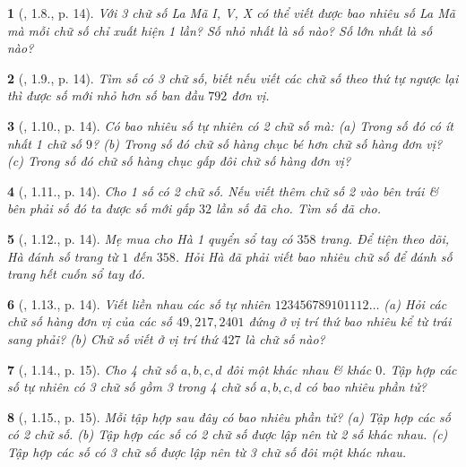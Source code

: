 \documentclass{article}
\newtheorem{baitoan}{}
\begin{document}
\begin{baitoan}[\cite{Binh_boi_duong_Toan_6_tap_1}, 1.8., p. 14]
	Với 3 chữ số La Mã I, V, X có thể viết được bao nhiêu số La Mã mà mỗi chữ số chỉ xuất hiện 1 lần? Số nhỏ nhất là số nào? Số lớn nhất là số nào?
\end{baitoan}

\begin{baitoan}[\cite{Binh_boi_duong_Toan_6_tap_1}, 1.9., p. 14]
	Tìm số có 3 chữ số, biết nếu viết các chữ số theo thứ tự ngược lại thì được số mới nhỏ hơn số ban đầu $792$ đơn vị.
\end{baitoan}

\begin{baitoan}[\cite{Binh_boi_duong_Toan_6_tap_1}, 1.10., p. 14]
	Có bao nhiêu số tự nhiên có 2 chữ số mà: (a) Trong số đó có ít nhất 1 chữ số $9$? (b) Trong số đó chữ số hàng chục bé hơn chữ số hàng đơn vị? (c) Trong số đó chữ số hàng chục gấp đôi chữ số hàng đơn vị?
\end{baitoan}

\begin{baitoan}[\cite{Binh_boi_duong_Toan_6_tap_1}, 1.11., p. 14]
	Cho 1 số có 2 chữ số. Nếu viết thêm chữ số 2 vào bên trái \& bên phải số đó ta được số mới gấp $32$ lần số đã cho. Tìm số đã cho.
\end{baitoan}

\begin{baitoan}[\cite{Binh_boi_duong_Toan_6_tap_1}, 1.12., p. 14]
	Mẹ mua cho Hà 1 quyển sổ tay có $358$ trang. Để tiện theo dõi, Hà đánh số trang từ $1$ đến $358$. Hỏi Hà đã phải viết bao nhiêu chữ số để đánh số trang hết cuốn sổ tay đó.
\end{baitoan}

\begin{baitoan}[\cite{Binh_boi_duong_Toan_6_tap_1}, 1.13., p. 14]
	Viết liền nhau các số tự nhiên $123456789101112\ldots$ (a) Hỏi các chữ số hàng đơn vị của các số $49,217,2401$ đứng ở vị trí thứ bao nhiêu kể từ trái sang phải? (b) Chữ số viết ở vị trí thứ $427$ là chữ số nào?
\end{baitoan}

\begin{baitoan}[\cite{Binh_boi_duong_Toan_6_tap_1}, 1.14., p. 15]
	Cho 4 chữ số $a,b,c,d$ đôi một khác nhau \& khác $0$. Tập hợp các số tự nhiên có 3 chữ số gồm 3 trong 4 chữ số $a,b,c,d$ có bao nhiêu phần tử?
\end{baitoan}

\begin{baitoan}[\cite{Binh_boi_duong_Toan_6_tap_1}, 1.15., p. 15]
	Mỗi tập hợp sau đây có bao nhiêu phần tử? (a) Tập hợp các số có 2 chữ số. (b) Tập hợp các số có 2 chữ số được lập nên từ 2 số khác nhau. (c) Tập hợp các số có 3 chữ số được lập nên từ 3 chữ số đôi một khác nhau.
\end{baitoan}
\end{document}
